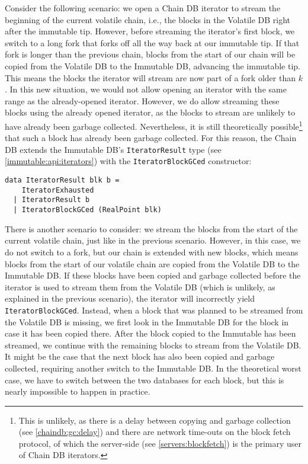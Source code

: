 Consider the following scenario: we open a Chain DB iterator to stream the
beginning of the current volatile chain, i.e., the blocks in the Volatile DB
right after the immutable tip. However, before streaming the iterator's first
block, we switch to a long fork that forks off all the way back at our immutable
tip. If that fork is longer than the previous chain, blocks from the start of
our chain will be copied from the Volatile DB to the Immutable DB,
advancing the immutable tip. This means the blocks the iterator will stream are
now part of a fork older than $k$. In this new situation, we would not allow
opening an iterator with the same range as the already-opened iterator. However,
we do allow streaming these blocks using the already opened iterator, as the
blocks to stream are unlikely to have already been garbage collected.
Nevertheless, it is still theoretically possible\footnote{This is unlikely, as
there is a delay between copying and garbage collection (see
\cref{chaindb:gc:delay}) and there are network time-outs on the block fetch
protocol, of which the server-side (see \cref{servers:blockfetch}) is the
primary user of Chain DB iterators.} that such a block has already been garbage
collected. For this reason, the Chain DB extends the Immutable DB's
\lstinline!IteratorResult! type (see \cref{immutable:api:iterators}) with the
\lstinline!IteratorBlockGCed! constructor:
%
\begin{lstlisting}
data IteratorResult blk b =
    IteratorExhausted
  | IteratorResult b
  | IteratorBlockGCed (RealPoint blk)
\end{lstlisting}

There is another scenario to consider: we stream the blocks from the start of
the current volatile chain, just like in the previous scenario. However, in this
case, we do not switch to a fork, but our chain is extended with new blocks,
which means blocks from the start of our volatile chain are copied from the
Volatile DB to the Immutable DB. If these blocks have been copied and garbage
collected before the iterator is used to stream them from the Volatile DB (which
is unlikely, as explained in the previous scenario), the iterator will
incorrectly yield \lstinline!IteratorBlockGCed!. Instead, when a block that was
planned to be streamed from the Volatile DB is missing, we first look in the
Immutable DB for the block in case it has been copied there. After the block
copied to the Immutable has been streamed, we continue with the remaining blocks
to stream from the Volatile DB. It might be the case that the next block has
also been copied and garbage collected, requiring another switch to the
Immutable DB. In the theoretical worst case, we have to switch between the two
databases for each block, but this is nearly impossible to happen in practice.

